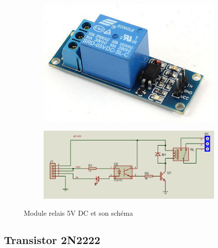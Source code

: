 	
	
	
	\begin{figure}[H]
		\centering
		\begin{subfigure}{0.25\textwidth} %
			\centering
			\includegraphics[width=\linewidth]{./img/composants/relais.png}
			\label{fig:acs712a}
		\end{subfigure}
		\hfill
		\begin{subfigure}{0.70\textwidth} %
			\centering
			\includegraphics[width=12cm]{./img/composants/relais.PNG}
			\label{fig:acs712b}
		\end{subfigure}
		\caption{Module relais 5V DC \cite{2} et son schéma}
		\label{fig:combined}
	\end{figure}
	
\subsection{Transistor 2N2222}
	
